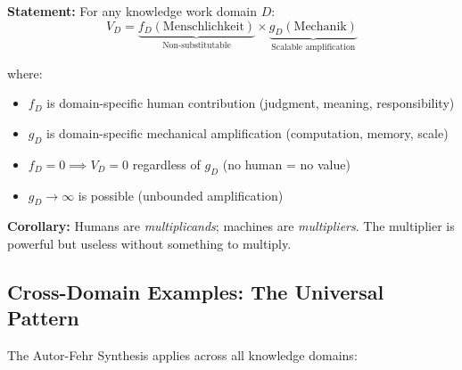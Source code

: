 \begin{tcolorbox}[colback=gray!5!white, colframe=gray!75!black,
    title=Axiom AF-2: The Knowledge Work Formula]
\textbf{Statement:} For any knowledge work domain $D$:
\begin{equation}
V_D = \underbrace{f_D(\text{Menschlichkeit})}_{\text{Non-substitutable}} \times \underbrace{g_D(\text{Mechanik})}_{\text{Scalable amplification}}
\end{equation}

where:
\begin{itemize}[nosep]
    \item $f_D$ is domain-specific human contribution (judgment, meaning, responsibility)
    \item $g_D$ is domain-specific mechanical amplification (computation, memory, scale)
    \item $f_D = 0 \implies V_D = 0$ regardless of $g_D$ (no human = no value)
    \item $g_D \to \infty$ is possible (unbounded amplification)
\end{itemize}

\textbf{Corollary:} Humans are \textit{multiplicands}; machines are \textit{multipliers}. The multiplier is powerful but useless without something to multiply.
\end{tcolorbox}

\subsection{Cross-Domain Examples: The Universal Pattern}

The Autor-Fehr Synthesis applies across all knowledge domains:


